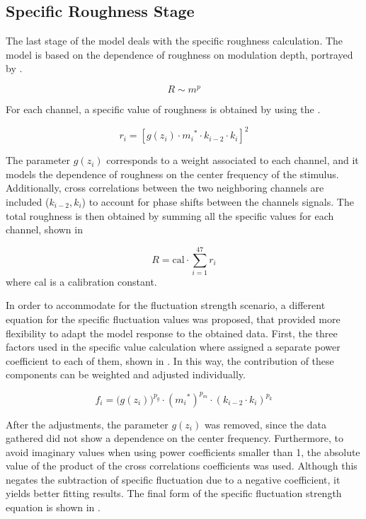 \documentclass[../main.tex]{subfiles}
\begin{document}
\begin{modelchapter}
\subsection{Specific Roughness Stage}

The last stage of the model deals with the specific roughness calculation. The
model is based on the dependence of roughness on modulation depth, portrayed
by .

\begin{equation}
  R \sim m^p
  \label{eq:roughness_modulation_depth}
\end{equation}

For each channel, a specific value of roughness is obtained by using the
.

\begin{equation}
  r_i = [g(z_i) \cdot {m_i}^* \cdot k_{i-2} \cdot k_i]^2
  \label{eq:ri}
\end{equation}

The parameter $g(z_i)$ corresponds to a weight associated to each channel, and
it models the dependence of roughness on the center frequency of the stimulus.
Additionally, cross correlations between the two neighboring channels are
included ($k_{i-2}, k_i$) to account for phase shifts between the channels
signals. The total roughness is then obtained by summing all the specific
values for each channel, shown in 

\begin{equation}
  R = \text{cal} \cdot \displaystyle\sum_{i=1}^{47} r_i
  \label{eq:total_roughness}
\end{equation}
where cal is a calibration constant.

In order to accommodate for the fluctuation strength scenario, a different
equation for the specific fluctuation values was proposed, that provided more
flexibility to adapt the model response to the obtained data. First, the three
factors used in the specific value calculation where assigned a separate power
coefficient to each of them, shown in . In this way, the
contribution of these components can be weighted and adjusted individually.

\begin{equation}
  f_i = \big(g(z_i)\big)^{p_g} \cdot ({m_i}^*)^{p_m}
    \cdot (k_{i-2} \cdot k_i)^{p_k}
  \label{eq:fi}
\end{equation}

After the adjustments, the parameter $g(z_i)$ was removed, since the data
gathered did not show a dependence on the center frequency. Furthermore, to
avoid imaginary values when using power coefficients smaller than 1, the
absolute value of the product of the cross correlations coefficients was used.
Although this negates the subtraction of specific fluctuation due to a negative
coefficient, it yields better fitting results. The final form of the specific
fluctuation strength equation is shown in .


\end{modelchapter}
\end{document}
